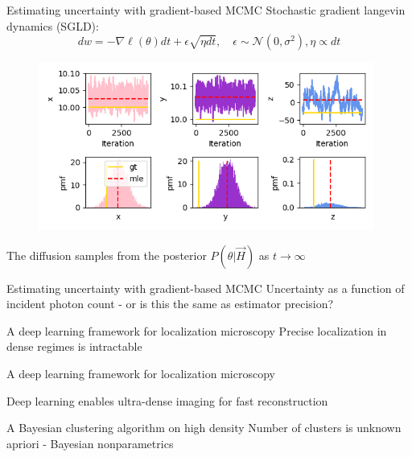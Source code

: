 \documentclass{beamer}					%
\begin{document}
\begin{frame}{Estimating uncertainty with gradient-based MCMC}
Stochastic gradient langevin dynamics (SGLD): $$dw = - \nabla \ell(\theta) dt + \epsilon \sqrt{\eta dt}, \quad \epsilon \sim \mathcal N(0, \sigma^2), \eta \propto dt$$
\begin{figure}
\includegraphics[width=11cm]{SGLD.png}
\end{figure}
The diffusion samples from the posterior $P(\theta|\vec{H})$ as $t\rightarrow\infty$

\end{frame}


\begin{frame}{Estimating uncertainty with gradient-based MCMC}
Uncertainty as a function of incident photon count - or is this the same as estimator precision?
\end{frame}

\begin{frame}{A deep learning framework for localization microscopy}
Precise localization in dense regimes is intractable

\end{frame}

\begin{frame}{A deep learning framework for localization microscopy}
\end{frame}

\begin{frame}{Deep learning enables ultra-dense imaging for fast reconstruction}

\end{frame}


\begin{frame}{A Bayesian clustering algorithm on high density}
Number of clusters is unknown apriori - Bayesian nonparametrics
\end{frame}
\end{document}
